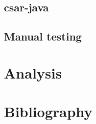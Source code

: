 \documentclass[12pt, letterpaper]{article}
\begin{document}
\subsection{csar-java}

\subsection{Manual testing}

\section{Analysis}

\section{Bibliography}
\printbibliography[heading=none]
\end{document}
